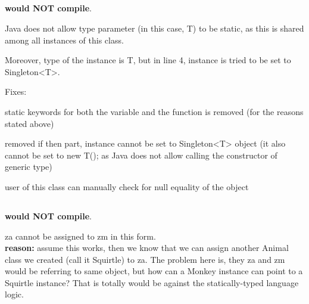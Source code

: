 \setlength{\columnseprule}{1.5pt}

\subsection{}
	
	\begin{paracol}{2}
		
			\switchcolumn
		
		\textbf{would NOT compile}.\\
		\begin{compactitem}
			\item Java does not allow type parameter (in this case, T) to be static, as this is shared among all instances of this class.
		
			\item Moreover, type of the instance is T, but in line 4, instance is tried to be set to Singleton<T>.
		\end{compactitem}
	\end{paracol}
	\bigskip
	
	\begin{paracol}{2}
		
%		
		\switchcolumn
		
		Fixes:
		\begin{compactitem}
			\item static keywords for both the variable and the function is removed (for the reasons stated above)
			\item removed if then part, instance cannot be set to Singleton<T> object (it also cannot be set to new T(); as Java does not allow calling the constructor of generic type)
			\item user of this class can manually check for null equality of the object
		\end{compactitem}
	\end{paracol}


\subsection{}

	\begin{paracol}{2}
		
		\switchcolumn
		
		\textbf{would NOT compile}.
		\begin{compactitem}
			\item za cannot be assigned to zm in this form.\\
			\textbf{reason:} assume this works, then we know that we can assign another Animal class we created (call it Squirtle) to za. The problem here is, they za and zm would be referring to same object, but how can a Monkey instance can point to a Squirtle instance? That is totally would be against the statically-typed language logic.
		\end{compactitem}
	\end{paracol}
	\bigskip
	
